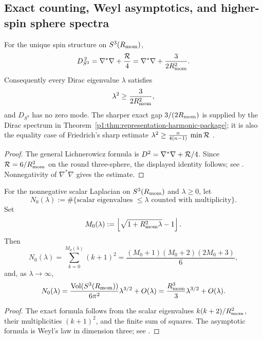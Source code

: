 \documentclass[11pt]{article}
\begin{document}
\subsection{Exact counting, Weyl asymptotics, and higher-spin sphere spectra}
\label{p1:subsec:complete-sphere-spectra}

\begin{theorem}
\label{p1:thm:lichnerowicz-s3}
For the unique spin structure on \(S^3(R_{\mathrm{mom}})\),
\[
  D_{S^3}^{\,2}
  =\nabla^*\nabla+\frac{\mathcal R}{4}
  =\nabla^*\nabla+\frac{3}{2R_{\mathrm{mom}}^2}.
\]
Consequently every Dirac eigenvalue \(\lambda\) satisfies
\[
  \lambda^2\ge\frac{3}{2R_{\mathrm{mom}}^2},
\]
and \(D_{S^3}\) has no zero mode.  The sharper exact gap
\(3/(2R_{\mathrm{mom}})\) is supplied by the Dirac spectrum in
Theorem~\ref{p1:thm:representation-harmonic-package}; it is also the
equality case of Friedrich's sharp estimate
\(\lambda^2\ge\tfrac{n}{4(n-1)}\,\min\mathcal R\)
\cite{Friedrich1980,Friedrich1997}.
\end{theorem}

\begin{proof}
The general Lichnerowicz formula is
\(D^2=\nabla^*\nabla+\mathcal R/4\).  Since
\(\mathcal R=6/R_{\mathrm{mom}}^2\) on the round three-sphere, the displayed identity follows;
see \cite{lichnerowicz1963spineurs,Friedrich1997}.  Nonnegativity of
\(\nabla^*\nabla\) gives the estimate.
\end{proof}

\begin{proposition}
\label{p1:prop:scalar-weyl-law}
For the nonnegative scalar Laplacian on \(S^3(R_{\mathrm{mom}})\) and
\(\lambda\ge0\), let
\[
  N_0(\lambda)
  :=\#\{\text{scalar eigenvalues }\leq\lambda\text{ counted with multiplicity}\}.
\]
Set
\[
  M_0(\lambda):=\left\lfloor\sqrt{1+R_{\mathrm{mom}}^2\lambda}-1\right\rfloor.
\]
Then
\[
  N_0(\lambda)
  =\sum_{k=0}^{M_0(\lambda)}(k+1)^2
  =\frac{(M_0+1)(M_0+2)(2M_0+3)}6,
\]
and, as \(\lambda\to\infty\),
\[
  N_0(\lambda)
  =\frac{\operatorname{Vol}(S^3(R_{\mathrm{mom}}))}{6\pi^2}\lambda^{3/2}+O(\lambda)
  =\frac{R_{\mathrm{mom}}^3}{3}\lambda^{3/2}+O(\lambda).
\]
\end{proposition}

\begin{proof}
The exact formula follows from the scalar eigenvalues
\(k(k+2)/R_{\mathrm{mom}}^2\), their multiplicities \((k+1)^2\), and the finite sum of
squares.  The asymptotic formula is Weyl's law in dimension three; see
\cite{Weyl1946,berline1992heat}.
\end{proof}
\end{document}
